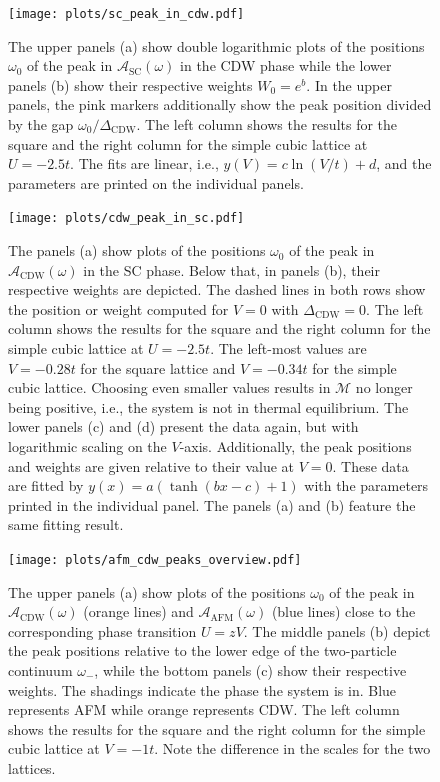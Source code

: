 \documentclass[
    reprint, 
    aps,
    preprintnumbers,
    twocolumn,
    prb,
    superscriptaddress
]{revtex4-2}
\newcommand{\spectral}[1]{\mathcal{A}_\text{#1}  (\omega)}
\begin{document}
\begin{figure}
    \centering
    \texttt{[image: plots/sc\_peak\_in\_cdw.pdf]}
    \caption{The upper panels (a) show double logarithmic plots of the positions $\omega_0$ of the peak in $\spectral{SC}$ in the CDW phase while the lower panels (b) show their respective weights $W_0 = e^{b}$.
    In the upper panels, the pink markers additionally show the peak position divided by the gap $\omega_0 / \Delta_\text{CDW}$.
    The left column shows the results for the square and the right column for the simple cubic lattice at $U=-2.5t$.
    The fits are linear, i.e., $y(V) = c \ln(V/t) + d$, and the parameters are printed on the individual panels.}
    \label{fig:sc_in_cdw_behavior}
\end{figure}

\begin{figure}
    \centering
    \texttt{[image: plots/cdw\_peak\_in\_sc.pdf]}
    \caption{The panels (a) show plots of the positions $\omega_0$ of the peak in $\spectral{CDW}$ in the SC phase.
    Below that, in panels (b), their respective weights are depicted.
    The dashed lines in both rows show the position or weight computed for $V=0$ with $\Delta_\text{CDW} = 0$.
    The left column shows the results for the square and the right column for the simple cubic lattice at $U=-2.5t$.
    The left-most values are $V=-0.28t$ for the square lattice and $V=-0.34t$ for the simple cubic lattice.
    Choosing even smaller values results in $\mathcal{M}$ no longer being positive, i.e., the system is not in thermal equilibrium.
    \newline
    The lower panels (c) and (d) present the data again, but with logarithmic scaling on the $V$-axis.
    Additionally, the peak positions and weights are given relative to their value at $V=0$.
    These data are fitted by $y(x) = a (\tanh (bx - c) + 1)$ with the parameters printed in the individual panel.
    The panels (a) and (b) feature the same fitting result.}
    \label{fig:cdw_in_sc_behavior}
\end{figure}

\begin{figure}
    \centering
    \texttt{[image: plots/afm\_cdw\_peaks\_overview.pdf]}
    \caption{The upper panels (a) show plots of the positions $\omega_0$ of the peak in $\spectral{CDW}$ (orange lines) and $\spectral{AFM}$ (blue lines) close to the corresponding phase transition $U = zV$.
    The middle panels (b) depict the peak positions relative to the lower edge of the two-particle continuum $\omega_-$, while the bottom panels (c) show their respective weights.
    The shadings indicate the phase the system is in. Blue represents AFM while orange represents CDW.
    The left column shows the results for the square and the right column for the simple cubic lattice at $V=-1t$.
    Note the difference in the scales for the two lattices.}
    \label{fig:afm_cdw_peaks_overview}
\end{figure}
\end{document}
